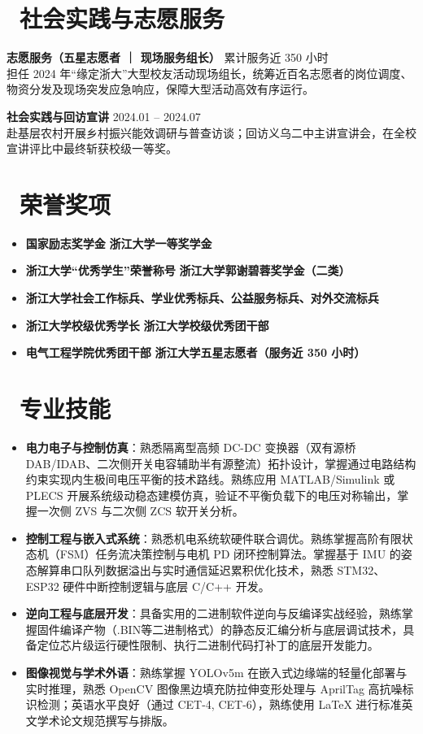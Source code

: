 \documentclass[11pt]{article}
\newlength{\interProjectSpacing}
\newcommand{\projectsep}{\vspace{\interProjectSpacing}}
\begin{document}
\section{\makebox[\widthof{\faInfo}][c]{\color{CVBlue}\faInfo}\ 社会实践与志愿服务}
\textbf{志愿服务（五星志愿者 ｜ 现场服务组长）} \hfill 累计服务近 350 小时 \\
担任 2024 年“缘定浙大”大型校友活动现场组长，统筹近百名志愿者的岗位调度、物资分发及现场突发应急响应，保障大型活动高效有序运行。

\projectsep

\textbf{社会实践与回访宣讲} \hfill 2024.01 -- 2024.07 \\
赴基层农村开展乡村振兴能效调研与普查访谈；回访义乌二中主讲宣讲会，在全校宣讲评比中最终斩获校级一等奖。


\section{\makebox[\widthof{\faGraduationCap}][c]{\color{CVBlue}\faList}\ 荣誉奖项}
\begin{itemize}[nosep]
    \item \textbf{国家励志奖学金} \hfill \textbf{浙江大学一等奖学金}
    \item \textbf{浙江大学“优秀学生”荣誉称号} \hfill \textbf{浙江大学郭谢碧蓉奖学金（二类）}
    \item \textbf{浙江大学社会工作标兵、学业优秀标兵、公益服务标兵、对外交流标兵}
    \item \textbf{浙江大学校级优秀学长} \hfill \textbf{浙江大学校级优秀团干部}
    \item \textbf{电气工程学院优秀团干部} \hfill \textbf{浙江大学五星志愿者（服务近 350 小时）}
\end{itemize}
    

\section{\makebox[\widthof{\faCogs}][c]{\color{CVBlue}\faCogs}\ 专业技能}
\begin{itemize}[nosep]
    \item \textbf{电力电子与控制仿真}：熟悉隔离型高频 DC-DC 变换器（双有源桥 DAB/IDAB、二次侧开关电容辅助半有源整流）拓扑设计，掌握通过电路结构约束实现内生极间电压平衡的技术路线。熟练应用 MATLAB/Simulink 或 PLECS 开展系统级动稳态建模仿真，验证不平衡负载下的电压对称输出，掌握一次侧 ZVS 与二次侧 ZCS 软开关分析。
    \item \textbf{控制工程与嵌入式系统}：熟悉机电系统软硬件联合调优。熟练掌握高阶有限状态机（FSM）任务流决策控制与电机 PD 闭环控制算法。掌握基于 IMU 的姿态解算串口队列数据溢出与实时通信延迟累积优化技术，熟悉 STM32、ESP32 硬件中断控制逻辑与底层 C/C++ 开发。
    \item \textbf{逆向工程与底层开发}：具备实用的二进制软件逆向与反编译实战经验，熟练掌握固件编译产物（.BIN等二进制格式）的静态反汇编分析与底层调试技术，具备定位芯片级运行硬性限制、执行二进制代码打补丁的底层开发能力。
    \item \textbf{图像视觉与学术外语}：熟练掌握 YOLOv5m 在嵌入式边缘端的轻量化部署与实时推理，熟悉 OpenCV 图像黑边填充防拉伸变形处理与 AprilTag 高抗噪标识检测；英语水平良好（通过 CET-4, CET-6），熟练使用 LaTeX 进行标准英文学术论文规范撰写与排版。
\end{itemize}
\end{document}
